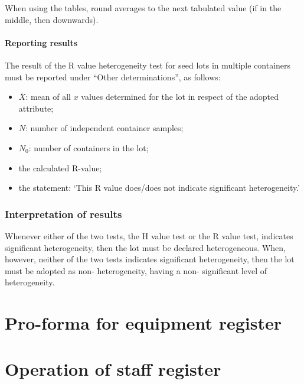 \documentclass[
]{book}
\providecommand{\tightlist}{%
  \setlength{\itemsep}{0pt}\setlength{\parskip}{0pt}}
\begin{document}
When using the tables, round averages to the next tabulated value (if in the middle, then downwards).

\hypertarget{reporting-results-1}{%
\subsubsection{Reporting results}\label{reporting-results-1}}

The result of the R value heterogeneity test for seed lots in multiple containers must be reported under ``Other determinations'', as follows:

\begin{itemize}
\tightlist
\item
  \(\bar{X}\): mean of all \(x\) values determined for the lot in respect of the adopted attribute;
\item
  \(N\): number of independent container samples;
\item
  \(N_0\): number of containers in the lot;
\item
  the calculated R-value;
\item
  the statement: `This R value does/does not indicate significant heterogeneity.'
\end{itemize}

\hypertarget{interpretation-of-results}{%
\subsection{Interpretation of results}\label{interpretation-of-results}}

Whenever either of the two tests, the H value test or the R value test, indicates significant heterogeneity, then the lot must be declared heterogeneous. When, however, neither of the two tests indicates significant heterogeneity, then the lot must be adopted as non- heterogeneity, having a non- significant level of heterogeneity.

\hypertarget{pro-forma-for-equipment-register}{%
\chapter{Pro-forma for equipment register}\label{pro-forma-for-equipment-register}}

\hypertarget{operation-of-staff-register}{%
\chapter{Operation of staff register}\label{operation-of-staff-register}}
\end{document}
